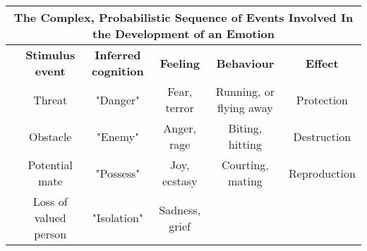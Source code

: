 \documentclass[landscape]{article}
\begin{document}
\pagestyle{empty}
\begin{center}

\begingroup
\large
\begin{tabular}{|l|c|c|c|c|c|}
\hline

\multicolumn{6}{|c|}{ \bf  The Complex, Probabilistic Sequence of Events Involved In the Development of an Emotion} \\ 

\hline

& {\bf Stimulus event} 
	

& {\bf Inferred cognition} 
	

& {\bf Feeling} 
	

& {\bf Behaviour} 
	

& {\bf Effect} \\
\hline
 
\definecolor{softgreen}{RGB}{144,201,144}
{\color{softgreen} \rule{0.3cm}{1cm}}
	

 & Threat 
	

& "Danger" 
	

& Fear, terror 
	

 & Running, or flying away 
	

& Protection \\ 

 
\definecolor{softred}{RGB}{255,74,74}
{\color{softred} \rule{0.3cm}{1cm}}
	

& Obstacle 
	

& "Enemy" 
	

& Anger, rage 
	

& Biting, hitting 
	

 & Destruction\\ 

 
	
\definecolor{softbrown}{RGB}{57,57,0}
{\color{softbrown} \rule{0.3cm}{1cm}}


& Potential mate 
	

& "Possess" 
	

& Joy, ecstasy 
	

& Courting, mating 
	

& Reproduction\\ 

 
	
\definecolor{softblue}{RGB}{191,207,252}
{\color{softblue} \rule{0.3cm}{1cm}}

& Loss of valued person 
	

& "Isolation" 
	

& Sadness, grief 
	


\end{tabular}
\end{center}
\end{document}
